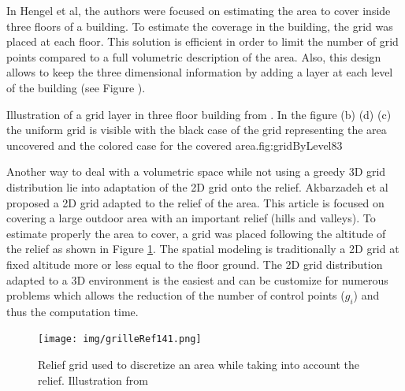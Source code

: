 In  Hengel et al\cite{83*van2009}, the authors were focused on estimating the area to cover inside three floors of a building. To estimate the coverage in the building, the grid was placed at each floor. This solution is efficient in order to limit the number of grid points compared to a full volumetric description of the area. Also, this design allows to keep the three dimensional information by adding a layer at each level of the building (see Figure ). 
 \begin{mfigures}[!]{Illustration of a grid layer in three floor building from \citep{83*van2009}. In the figure (b) (d) (c) the uniform grid is visible with the black case of the grid representing the area uncovered and the colored case for the covered area.}{fig:gridByLevel83} \centering

\hspace{1cm}
\hspace{1cm}
\hspace{1cm}


\end{mfigures} 

Another way to deal with a volumetric space while not using a greedy 3D grid distribution lie into adaptation of the 2D grid onto the relief. Akbarzadeh et al\citep{141*akbarzadeh2013} proposed a 2D grid adapted to the relief of the area. This article is focused on covering a large outdoor area with an important relief (hills and valleys). To estimate properly the area to cover, a grid was placed following the altitude of the relief as shown in Figure \ref{fig:grilleRef141}. The spatial modeling is traditionally a 2D grid at fixed altitude more or less equal to the floor ground. 
The 2D grid distribution adapted to a 3D environment is the easiest and can be customize for numerous problems which allows the reduction of the number of control points ($g_i$) and thus  the computation time. 

\begin{figure}[t!]
\begin{center}
   \texttt{[image: img/grilleRef141.png]}
  \caption{Relief grid used to discretize  an area while taking into account the relief. Illustration from \cite{141*akbarzadeh2013} }\label{fig:grilleRef141}
  \endminipage\hfill
  \end{center}
\end{figure}

